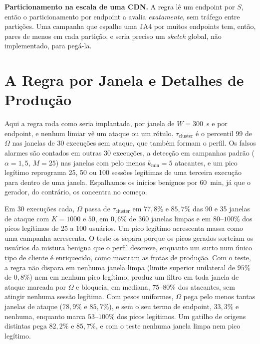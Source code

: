 \documentclass[conference,letterpaper,10pt]{IEEEtran}
\newcommand\1{\textit{(i)}}
\newcommand\2{\textit{(ii)}}
\newcommand\3{\textit{(iii)}}
\begin{document}
\textbf{Particionamento na escala de uma CDN.} A regra lê um endpoint por $S$, então o particionamento por endpoint a avalia \textit{exatamente}, sem tráfego entre partições. Uma campanha que espalhe uma JA4 por muitos endpoints tem, então, pares de menos em cada partição, e seria preciso um \textit{sketch} global, não implementado, para pegá-la.

\section{A Regra por Janela e Detalhes de Produção}
\label{app:window}

Aqui a regra roda como seria implantada, por janela de $W = 300$~s e por endpoint, e nenhum limiar vê um ataque ou um rótulo. $\tau_{\mathrm{cluster}}$ é o percentil 99 de $\Omega$ nas janelas de 30 execuções sem ataque, que também formam o perfil. Os falsos alarmes são contados em outras 30 execuções, a detecção em campanhas padrão ($\alpha = 1{,}5$, $M = 25$) nas janelas com pelo menos $k_{\min} = 5$ atacantes, e um pico legítimo reprograma 25, 50 ou 100 sessões legítimas de uma terceira execução para dentro de uma janela. Espalhamos os inícios benignos por 60~min, já que o gerador, do contrário, os concentra no começo.

Em 30 execuções cada, $\Omega$ passa de $\tau_{\mathrm{cluster}}$ em $77{,}8\%$ e $85{,}7\%$ das 90 e 35 janelas de ataque com $K = 1000$ e $50$, em $0{,}6\%$ de 360 janelas limpas e em $80$--$100\%$ dos picos legítimos de 25 a 100 usuários. Um pico legítimo acrescenta massa como uma campanha acrescenta. O teste os separa porque os picos gerados sorteiam os usuários da mistura benigna que o perfil descreve, enquanto um surto num único tipo de cliente é enriquecido, como mostram as frotas de produção. Com o teste, a regra não dispara em nenhuma janela limpa (limite superior unilateral de $95\%$ de $0{,}8\%$) nem em nenhum pico legítimo, produz um filtro em toda janela de ataque marcada por $\Omega$ e bloqueia, em mediana, $75$--$80\%$ dos atacantes, sem atingir nenhuma sessão legítima. Com pesos uniformes, $\Omega$ pega pelo menos tantas janelas de ataque ($78{,}9\%$ e $85{,}7\%$), e sem o seu termo de endpoint, $33{,}3\%$ e nenhuma, enquanto marca $53$--$100\%$ dos picos legítimos. Um gatilho de origens distintas pega $82{,}2\%$ e $85{,}7\%$, e com o teste nenhuma janela limpa nem pico legítimo.
\end{document}
